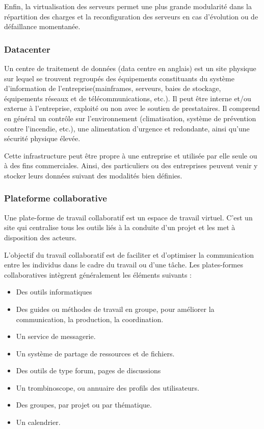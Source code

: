   	Enfin, la virtualisation des serveurs permet une plus grande modularité dans la répartition des charges et la reconfiguration des serveurs en cas d'évolution ou de défaillance momentanée.
  	
  	\subsubsection{Datacenter}
  	Un centre de traitement de données (data centre en anglais) est un site physique sur lequel se trouvent regroupés des équipements constituants du système d'information de l'entreprise(mainframes, serveurs, baies de stockage, équipements réseaux et de télécommunications, etc.). Il peut être interne et/ou externe à l'entreprise, exploité ou non avec le soutien de prestataires. Il comprend en général un contrôle sur l'environnement (climatisation, système de prévention contre l'incendie, etc.), une alimentation d'urgence et redondante, ainsi qu'une sécurité physique élevée.
  	
  	Cette infrastructure peut être propre à une entreprise et utilisée par elle seule ou à des fins commerciales. Ainsi, des particuliers ou des entreprises peuvent venir y stocker leurs données suivant des modalités bien définies. 
  	
  \subsubsection{Plateforme collaborative}
 
 
 Une plate-forme de travail collaboratif est un espace de travail virtuel. C'est un site qui centralise tous les outils liés à la conduite d'un projet et les met à disposition des acteurs.
 
 L'objectif du travail collaboratif est de faciliter et d'optimiser la communication entre les individus dans le cadre du travail ou d'une tâche. Les plates-formes collaboratives intègrent généralement les éléments suivants :
 
 
 \begin{itemize}
\item Des outils informatiques
\item Des guides ou méthodes de travail en groupe, pour améliorer la communication, la production, la coordination.
\item 	Un service de messagerie.
\item 	Un système de partage de ressources et de fichiers.
\item 	Des outils de type forum, pages de discussions
\item 	Un trombinoscope, ou annuaire des profils des utilisateurs.
\item 	Des groupes, par projet ou par thématique.
\item 	Un calendrier. 
 
 \end{itemize}
 

